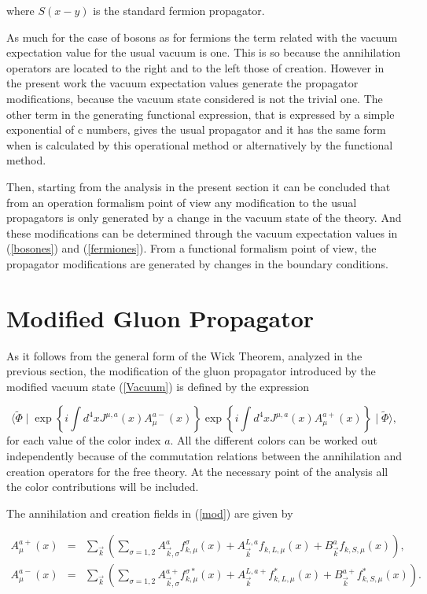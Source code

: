\documentclass[12pt,letterpaper]{report}
\begin{document}
where $S\left(x-y\right)$ is the standard fermion propagator.

As much for the case of bosons as for fermions the term related
with the vacuum expectation value for the usual vacuum is one.
This is so because the annihilation operators are located to the
right and to the left those of creation. However in the present
work the vacuum expectation values generate the propagator
modifications, because the vacuum state considered is not the
trivial one. The other term in the generating functional
expression, that is expressed by a simple exponential of c
numbers, gives the usual propagator and it has the same form when
is calculated by this operational method or alternatively by the
functional method.

Then, starting from the analysis in the present section it can be
concluded that from an operation formalism point of view any
modification to the usual propagators is only generated by a
change in the vacuum state of the theory. And these modifications
can be determined through the vacuum expectation values in
(\ref{bosones}) and (\ref{fermiones}). From a functional formalism
point of view, the propagator modifications are generated by
changes in the boundary conditions.

\section{Modified Gluon Propagator}

As it follows from the general form of the Wick Theorem, analyzed
in the previous section, the modification of the gluon propagator
introduced by the modified vacuum state (\ref{Vacuum}) is defined
by the expression

\begin{equation}
\langle \widetilde{\Phi }\mid \exp \left\{ i\int d^4xJ^{\mu
,a}\left(x\right) A_\mu ^{a-}\left(x\right) \right\} \exp \left\{
i\int d^4xJ^{\mu,a}\left(x\right) A_\mu ^{a+}\left(x\right)
\right\} \mid \widetilde{\Phi } \rangle, \label{mod}
\end{equation}
for each value of the color index $a$. All the different colors
can be worked out independently because of the commutation
relations between the annihilation and creation operators for the
free theory. At the necessary point of the analysis all the color
contributions will be included.

The annihilation and creation fields in (\ref{mod}) are given by

\begin{eqnarray*}
A_\mu ^{a+}\left(x\right) &=&\sum\limits_{\vec{k}}\left(
\sum\limits_{\sigma =1,2}A_{\vec{k},\sigma }^af_{k,\mu }^\sigma
\left(x\right) +A_{\vec{k}}^{L,a}f_{k,L,\mu }\left(x\right)
+B_{\vec{k} }^af_{k,S,\mu }\left(x\right) \right), \\ A_\mu
^{a-}\left(x\right) &=&\sum\limits_{\vec{k}}\left(
\sum\limits_{\sigma =1,2}A_{\vec{k},\sigma }^{a+}f_{k,\mu
}^{\sigma *}\left(x\right) +A_{\vec{k}}^{L,a+}f_{k,L,\mu
}^{*}\left(x\right) +B_{\vec{k} }^{a+}f_{k,S,\mu }^{*}\left(
x\right) \right).
\end{eqnarray*}
\end{document}
